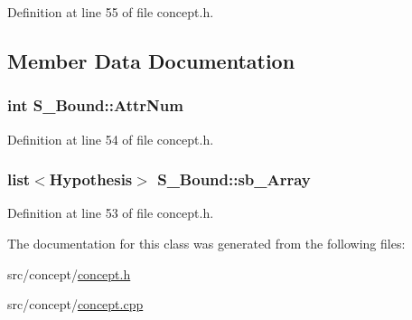 Definition at line 55 of file concept.\-h.



\subsection{Member Data Documentation}
\hypertarget{class_s___bound_a04cdddc7f5a38bb02bc8a706c275298f}{
\subsubsection[{Attr\-Num}]{\setlength{\rightskip}{0pt plus 5cm}int S\-\_\-\-Bound\-::\-Attr\-Num\hspace{0.3cm}{\ttfamily [private]}}}\label{class_s___bound_a04cdddc7f5a38bb02bc8a706c275298f}


Definition at line 54 of file concept.\-h.

\hypertarget{class_s___bound_a06e45530f4b7a999dfaa17ca73ef1d4f}{
\subsubsection[{sb\-\_\-\-Array}]{\setlength{\rightskip}{0pt plus 5cm}list$<${\bf Hypothesis}$>$ S\-\_\-\-Bound\-::sb\-\_\-\-Array\hspace{0.3cm}{\ttfamily [private]}}}\label{class_s___bound_a06e45530f4b7a999dfaa17ca73ef1d4f}


Definition at line 53 of file concept.\-h.



The documentation for this class was generated from the following files\-:\begin{DoxyCompactItemize}
\item 
src/concept/\hyperlink{concept_8h}{concept.\-h}\item 
src/concept/\hyperlink{concept_8cpp}{concept.\-cpp}\end{DoxyCompactItemize}
